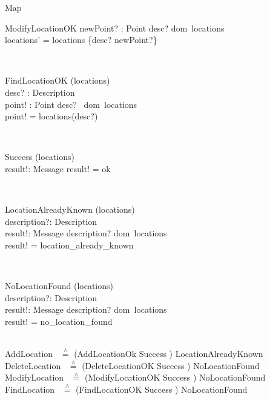 \documentclass[12pt]{article}
\begin{document}
\begin{spacing}{1.5}
\begin{class}{Map}
\begin{op}{ModifyLocationOK}
newPoint? : Point
\ST
desc? \in dom~locations \\
locations' = locations \oplus \{desc? \to newPoint?\}
\end{op}\\ 
\begin{op}{FindLocationOK}
\Xi (locations) \\
desc? : Description\\
point! : Point
\ST
desc? \in ~dom~locations \\
point! = locations(desc?)
\end{op}\\
\zbreak
\begin{op}{Success}
\Xi (locations) \\
result!: Message
\ST
result! = ok
\end{op}\\
\begin{op}{LocationAlreadyKnown}
\Xi (locations) \\
description?: Description \\
result!: Message
\ST
description? \in dom~locations \\
result! = location\_already\_known
\end{op}\\
\begin{op}{NoLocationFound}
\Xi (locations) \\
description?: Description \\
result!: Message
\ST
description? \notin dom~locations \\
result! = no\_location\_found
\end{op}\\
AddLocation ~$\stackrel{\wedge}{=}$ (AddLocationOk \land Success ) \lor LocationAlreadyKnown
\\
DeleteLocation ~$\stackrel{\wedge}{=}$ (DeleteLocationOK \land Success ) \lor NoLocationFound
\\
ModifyLocation ~$\stackrel{\wedge}{=}$ (ModifyLocationOK \land Success ) \lor NoLocationFound
\\
FindLocation ~$\stackrel{\wedge}{=}$ (FindLocationOK \land Success ) \lor NoLocationFound
\end{class}
\znewpage


\end{spacing}
\end{document}
